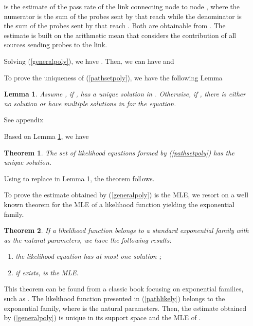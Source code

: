 \documentclass[10pt,twocolumn]{IEEEtran}
\newtheorem{theorem}{\hspace*{1pc}Theorem}
\newtheorem{lemma}{\hspace*{1pc}Lemma}
\begin{document}
is the estimate of the pass rate of the link connecting node  to
node , where the numerator is the sum of the probes sent by 
that reach  while the denominator is the sum of the probes sent
by  that reach . Both are obtainable from
. The estimate is built on the arithmetic mean that considers
the contribution of all sources sending probes to the link.

 Solving (\ref{generalpoly}), we have .
Then, we can have  and
 
To prove the uniqueness of (\ref{pathsetpoly}), we have the following
Lemma

\begin{lemma}\label{property of likelihood equation} Assume , if ,
 has a unique solution in
. Otherwise, if , there is  either no solution
or have multiple solutions in  for the equation.
\end{lemma}

\begin{IEEEproof}
See appendix \end{IEEEproof}

Based on Lemma \ref{property of likelihood equation}, we have
\begin{theorem} \label{unique theorem}
The set of likelihood equations formed by (\ref{pathsetpoly}) has the
unique solution.
\end{theorem}
\begin{IEEEproof}
Using  to replace 
in Lemma \ref{property of likelihood equation}, the theorem follows.
\end{IEEEproof}



 To prove the estimate obtained by (\ref{generalpoly}) is the MLE, we
resort on a well known theorem for the MLE of a likelihood function
yielding the exponential family.
\begin{theorem}\label{properties of statistics}
If a likelihood function  belongs to a standard exponential family
with  as the natural parameters, we have the following
results:
\begin{enumerate}
  \item the likelihood equation  has at most one solution
;
  \item if  exists,  is the MLE.
\end{enumerate}
\end{theorem}
\begin{IEEEproof}
This theorem can be found from a classic book focusing on exponential
families, such as \cite{Brown86}. The likelihood function presented in
(\ref{pathlikely}) belongs to the exponential family, where 
is the natural parameters. Then, the estimate obtained by
(\ref{generalpoly}) is unique in its support space and the MLE of
.
\end{IEEEproof}
\end{document}
